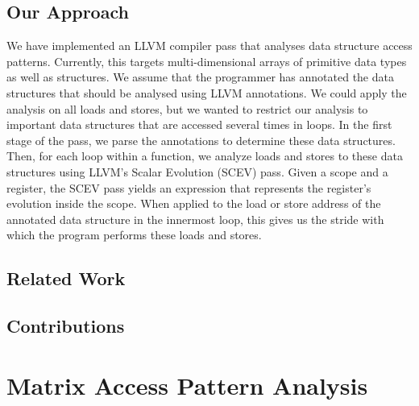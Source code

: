 \documentclass[letterpaper]{article}
\begin{document}
\subsection{Our Approach}

We have implemented an LLVM compiler pass that analyses data structure access patterns.
Currently, this targets multi-dimensional arrays of primitive data types as well as structures.
We assume that the programmer has annotated the data structures that should be
analysed using LLVM annotations.
We could apply the analysis on all loads and stores, but we wanted to restrict our
analysis to important data structures that are accessed several times in loops.
In the first stage of the pass, we parse the annotations to determine these data structures.
Then, for each loop within a function, we analyze loads and stores to these
data structures using LLVM's Scalar Evolution (SCEV) pass. Given a scope and a
register, the SCEV pass yields an expression that represents the register's
evolution inside the scope. When applied to the load or store address of the
annotated data structure in the innermost loop, this gives us the stride
with which the program performs these loads and stores.

\subsection{Related Work}

\subsection{Contributions}

\section{Matrix Access Pattern Analysis}
\end{document}

